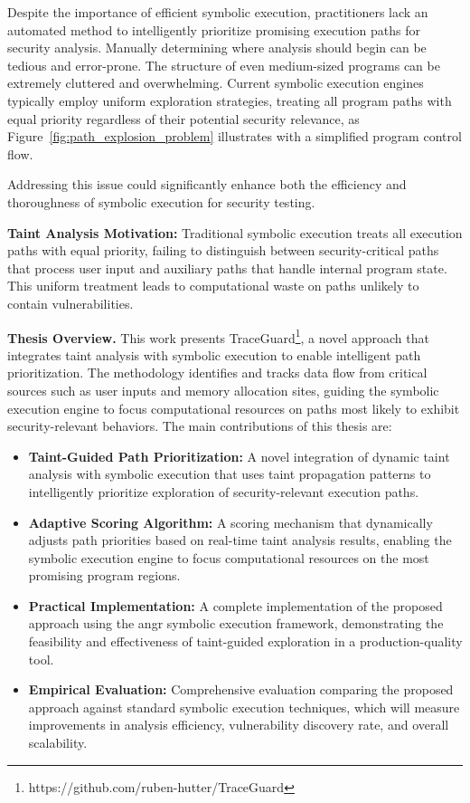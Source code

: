 Despite the importance of efficient symbolic execution, practitioners lack an automated method to intelligently prioritize promising execution paths for security analysis. Manually determining where analysis should begin can be tedious and error-prone. The structure of even medium-sized programs can be extremely cluttered and overwhelming. Current symbolic execution engines typically employ uniform exploration strategies, treating all program paths with equal priority regardless of their potential security relevance, as Figure~\ref{fig:path_explosion_problem} illustrates with a simplified program control flow.

Addressing this issue could significantly enhance both the efficiency and thoroughness of symbolic execution for security testing.

\textbf{Taint Analysis Motivation:} Traditional symbolic execution treats all execution paths with equal priority, failing to distinguish between security-critical paths that process user input and auxiliary paths that handle internal program state. This uniform treatment leads to computational waste on paths unlikely to contain vulnerabilities.

\textbf{Thesis Overview.} This work presents TraceGuard\footnote{https://github.com/ruben-hutter/TraceGuard}, a novel approach that integrates taint analysis with symbolic execution to enable intelligent path prioritization. The methodology identifies and tracks data flow from critical sources such as user inputs and memory allocation sites, guiding the symbolic execution engine to focus computational resources on paths most likely to exhibit security-relevant behaviors. The main contributions of this thesis are:

\begin{itemize}
    \item \textbf{Taint-Guided Path Prioritization:} A novel integration of dynamic taint analysis with symbolic execution that uses taint propagation patterns to intelligently prioritize exploration of security-relevant execution paths.

    \item \textbf{Adaptive Scoring Algorithm:} A scoring mechanism that dynamically adjusts path priorities based on real-time taint analysis results, enabling the symbolic execution engine to focus computational resources on the most promising program regions.

    \item \textbf{Practical Implementation:} A complete implementation of the proposed approach using the angr symbolic execution framework, demonstrating the feasibility and effectiveness of taint-guided exploration in a production-quality tool.

    \item \textbf{Empirical Evaluation:} Comprehensive evaluation comparing the proposed approach against standard symbolic execution techniques, which will measure improvements in analysis efficiency, vulnerability discovery rate, and overall scalability.
\end{itemize}

